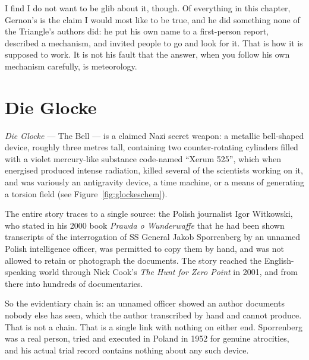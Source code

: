 I find I do not want to be glib about it, though. Of everything in this chapter, Gernon's is the
claim I would most like to be true, and he did something none of the Triangle's authors did: he
put his own name to a first-person report, described a mechanism, and invited people to go and
look for it. That is how it is supposed to work. It is not his fault that the answer, when you
follow his own mechanism carefully, is meteorology.

\section{Die Glocke}\label{sec:glocke}

\emph{Die Glocke} --- The Bell --- is a claimed Nazi secret weapon: a metallic bell-shaped
device, roughly three metres tall, containing two counter-rotating cylinders filled with a
violet mercury-like substance code-named ``Xerum 525'', which when energised produced
intense radiation, killed several of the scientists working on it, and was variously an
antigravity device, a time machine, or a means of generating a torsion field (see
Figure~\ref{fig:glockeschem}).

The entire story traces to a single source: the Polish journalist Igor Witkowski, who
stated in his 2000 book \emph{Prawda o Wunderwaffe} that he had been shown transcripts of
the interrogation of SS General Jakob Sporrenberg by an unnamed Polish intelligence officer,
was permitted to copy them by hand, and was not allowed to retain or photograph the
documents. The story reached the English-speaking world through Nick Cook's \emph{The Hunt
for Zero Point} in 2001, and from there into hundreds of documentaries.

So the evidentiary chain is: an unnamed officer showed an author documents nobody else has
seen, which the author transcribed by hand and cannot produce. That is not a chain. That is
a single link with nothing on either end. Sporrenberg was a real person, tried and executed
in Poland in 1952 for genuine atrocities, and his actual trial record contains nothing
about any such device.

